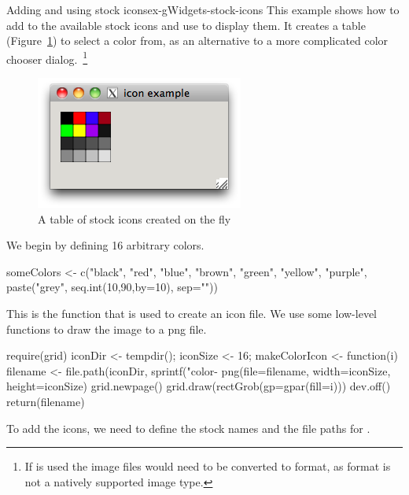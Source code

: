 \begin{example}{Adding and using stock icons}{ex-gWidgets-stock-icons}
This example shows how to add to the available stock icons and use
 to display them. It creates a table
(Figure~\ref{fig:gWidgets-stock-icons}) to select a color from, as an
alternative to a more complicated color chooser dialog.~\footnote{If
   is used the image files would need to be
  converted to  format, as  format is not a
  natively supported image type.}

\begin{figure}
  \centering
  \includegraphics[width=.5\textwidth]{fig-gWidgets-icon-example.png}
  \caption{A table of stock icons created on the fly}
  \label{fig:gWidgets-stock-icons}
\end{figure}

We begin by defining 16 arbitrary colors.

\begin{Schunk}
\begin{Sinput}
 someColors <- c("black", "red", "blue", "brown",
                 "green", "yellow", "purple",
                 paste("grey", seq.int(10,90,by=10), sep=""))
\end{Sinput}
\end{Schunk}

This is the function that is used to create an icon file. We use some
low-level  functions to draw the image to a png file.
\begin{Schunk}
\begin{Sinput}
 require(grid)
 iconDir <- tempdir(); iconSize <- 16;
 makeColorIcon <- function(i) {
   filename <- file.path(iconDir, 
                         sprintf("color-%
   png(file=filename, width=iconSize, height=iconSize)
   grid.newpage()
   grid.draw(rectGrob(gp=gpar(fill=i)))
   dev.off()
   return(filename)
 }
\end{Sinput}
\end{Schunk}

To add the icons, we need to define the stock names and the file paths
for .


\end{example}
